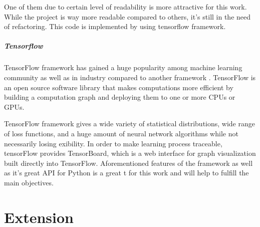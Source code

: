 One of them due to certain level of readability is more attractive for this work.
While the project is way more readable compared to others, it's still in the need
of refactoring.
This code is implemented by using tensorflow framework.

\subparagraph{Tensorflow}

TensorFlow framework has gained a huge popularity among machine learning
community as well as in industry compared to another framework \cite{Goldsborough}.
TensorFlow is an open source software library that makes computations more
efficient by building a computation graph and deploying them to one or more
CPUs or GPUs.


TensorFlow framework gives a wide variety of statistical distributions, wide
range of loss functions, and a huge amount of neural network algorithms while
not necessarily losing  exibility. In order to make learning process traceable,
tensorFlow provides TensorBoard, which is a web interface for graph visualization
built directly into TensorFlow. Aforementioned features of the framework as well
as it's great API for Python is a great  t for this work and will help to fulfill
the main objectives.


\section{Extension}










%


